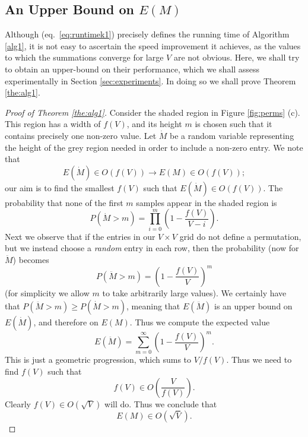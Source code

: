 \documentclass[a4paper,10pt]{article}
\newcommand{\eq}[1]{(eq.~\ref{#1})}
\begin{document}
\subsection{An Upper Bound on $E(M)$}

Although \eq{eq:runtimek1} precisely defines the running time of Algorithm \ref{alg1}, it is not easy to ascertain the speed improvement it achieves, as the values to which the summations converge for large $V$ are not obvious. Here, we shall try to obtain an upper-bound on their performance, which we shall assess experimentally in Section \ref{sec:experiments}. In doing so we shall prove Theorem \ref{the:alg1}.





\begin{proof}[Proof of Theorem \ref{the:alg1}]
Consider the shaded region in Figure \ref{fig:perms} (c). This region has a width of $f(V)$, and its height $m$ is chosen such that it contains precisely one non-zero value. Let $\dot{M}$ be a random variable representing the height of the grey region needed in order to include a non-zero entry. We note that
\begin{equation}
E(\dot{M}) \in O(f(V)) \rightarrow E(M) \in O(f(V));
\end{equation}
our aim is to find the smallest $f(V)$ such that $E(\dot{M}) \in O(f(V))$. The probability that none of the first $m$ samples appear in the shaded region is
\begin{equation}
 P(\dot{M} > m) = \prod_{i=0}^m \left( 1 - \frac{f(V)}{V - i}\right).
\label{eq:noreplace}
\end{equation}
Next we observe that if the entries in our $V\times V$ grid do not define a permutation, but we instead choose a \emph{random} entry in each row, then the probability (now for $\ddot{M}$) becomes
\begin{equation}
  P(\ddot{M} > m) = \left(1 - \frac{f(V)}{V}\right)^m
\label{eq:replace}
 \end{equation}
(for simplicity we allow $m$ to take arbitrarily large values). We certainly have that $P(\ddot{M}>m) \geq P(\dot{M}>m)$, meaning that $E(\ddot{M})$ is an upper bound on $E(\dot{M})$, and therefore on $E(M)$. Thus we compute the expected value
\begin{equation}
 E(\ddot{M}) = \sum_{m=0}^\infty \left(1 - \frac{f(V)}{V}\right)^m.
\end{equation}
This is just a geometric progression, which sums to ${V}/{f(V)}$. Thus we need to find $f(V)$ such that
\begin{equation}
 f(V) \in O\left(\frac{V}{f(V)}\right).
\end{equation}
Clearly $f(V) \in O(\sqrt{V})$ will do. Thus we conclude that
\begin{equation}
 E(M) \in O(\sqrt{V}).
\end{equation}
\end{proof}
\end{document}
